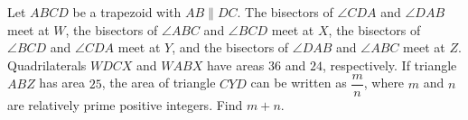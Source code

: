 Let $ABCD$ be a trapezoid with $AB\parallel DC$. The bisectors of $\angle CDA$ and $\angle DAB$ meet at $W$, the bisectors of $\angle ABC$ and $\angle BCD$ meet at $X$, the bisectors of $\angle BCD$ and $\angle CDA$ meet at $Y$, and the bisectors of $\angle DAB$ and $\angle ABC$ meet at $Z$. Quadrilaterals $WDCX$ and $WABX$ have areas $36$ and $24$, respectively. If triangle $ABZ$ has area $25$, the area of triangle $CYD$ can be written as $\dfrac mn$, where $m$ and $n$ are relatively prime positive integers. Find $m+n$.
